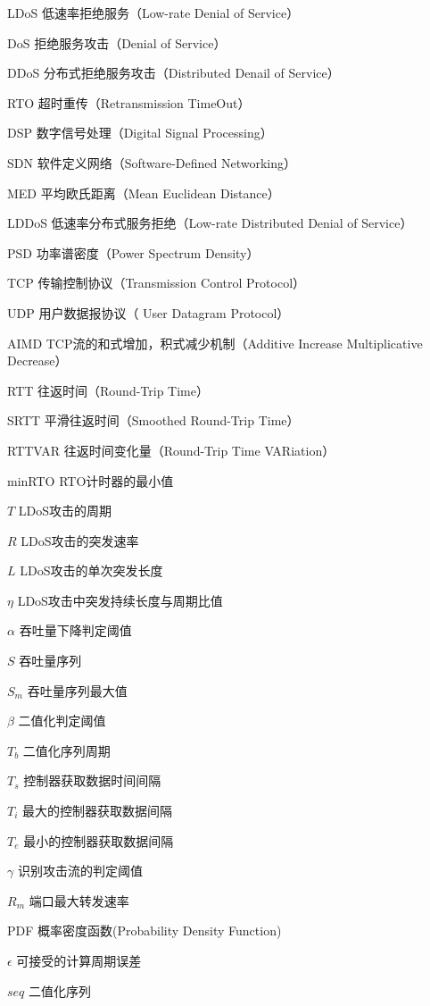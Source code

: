 \begin{denotation}[3cm]
    \item[LDoS] 低速率拒绝服务（Low-rate Denial of Service）
    \item[DoS] 拒绝服务攻击（Denial of Service）
    \item[DDoS] 分布式拒绝服务攻击（Distributed Denail of Service）
    \item[RTO] 超时重传（Retransmission TimeOut）
    \item[DSP] 数字信号处理（Digital Signal Processing）
    \item[SDN] 软件定义网络（Software-Defined Networking）
    \item[MED] 平均欧氏距离（Mean Euclidean Distance）
    \item[LDDoS] 低速率分布式服务拒绝（Low-rate Distributed Denial of Service）
    \item[PSD] 功率谱密度（Power Spectrum Density）
    \item[TCP] 传输控制协议（Transmission Control Protocol）
    \item[UDP] 用户数据报协议（ User Datagram Protocol）
    \item[AIMD] TCP流的和式增加，积式减少机制（Additive Increase Multiplicative Decrease）
    \item[RTT]	往返时间（Round-Trip Time）
    \item[SRTT] 平滑往返时间（Smoothed Round-Trip Time）
    \item[RTTVAR] 往返时间变化量（Round-Trip Time VARiation）
    \item[minRTO] RTO计时器的最小值
    \item[$T$] LDoS攻击的周期
    \item[$R$] LDoS攻击的突发速率
    \item[$L$] LDoS攻击的单次突发长度
    \item[$\eta$] LDoS攻击中突发持续长度与周期比值
    \item[$\alpha$] 吞吐量下降判定阈值
    \item[$S$] 吞吐量序列
    \item[$S_m$] 吞吐量序列最大值
    \item[$\beta$] 二值化判定阈值
    \item[$T_b$] 二值化序列周期
    \item[$T_s$] 控制器获取数据时间间隔
    \item[$T_i$] 最大的控制器获取数据间隔
    \item[$T_e$] 最小的控制器获取数据间隔
    \item[$\gamma$] 识别攻击流的判定阈值
    \item[$R_m$] 端口最大转发速率
    \item[PDF] 概率密度函数(Probability Density Function)
    \item[$\epsilon$] 可接受的计算周期误差
    \item[$seq$] 二值化序列

\end{denotation}



